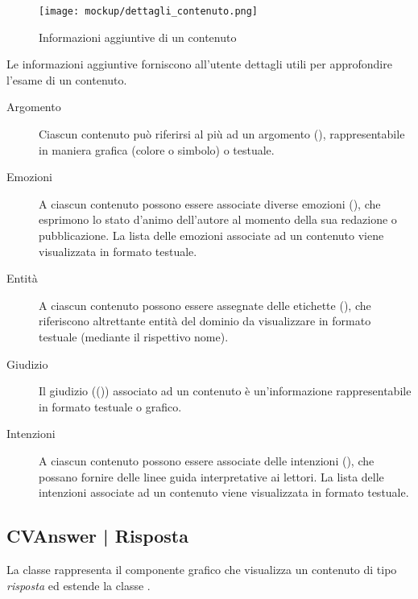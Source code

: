 \documentclass[10pt,a4paper,headinclude,footinclude,hidelinks]{scrreprt} %
\begin{document}
	\begin{figure}[ht]
		\begin{center}
	    	\texttt{[image: mockup/dettagli\_contenuto.png]}
			\label{gfx:mockup:content-details}
			\caption{Informazioni aggiuntive di un contenuto}
		\end{center}
	\end{figure}

	Le informazioni aggiuntive forniscono all'utente dettagli utili per approfondire l'esame di un contenuto.
	\begin{description}
	\item[Argomento] Ciascun contenuto può riferirsi al più ad un argomento (\textit{}), rappresentabile in maniera grafica (colore o simbolo) o testuale.
	\item[Emozioni] A ciascun contenuto possono essere associate diverse emozioni (\textit{}), che esprimono lo stato d'animo dell'autore al momento della sua redazione o pubblicazione. La lista delle emozioni associate ad un contenuto viene visualizzata in formato testuale.
	\item[Entit\`a] A ciascun contenuto possono essere assegnate delle etichette (\textit{}), che riferiscono altrettante entità del dominio da visualizzare in formato testuale (mediante il rispettivo nome).
	\item[Giudizio] Il giudizio ((\textit{})) associato ad un contenuto è un'informazione rappresentabile in formato testuale o grafico.
	\item[Intenzioni] A ciascun contenuto possono essere associate delle intenzioni (\textit{}), che possano fornire delle linee guida interpretative ai lettori. La lista delle intenzioni associate ad un contenuto viene visualizzata in formato testuale.
	\end{description}

	\subsection[CVAnswer]{CVAnswer | Risposta}
	\label{sec:stage:design:view:answer}
	La classe rappresenta il componente grafico che visualizza un contenuto di tipo \textit{risposta} ed estende la classe \textit{}.
\end{document}
